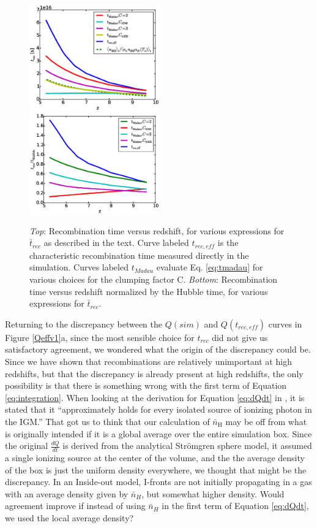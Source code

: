 \begin{figure}
    \includegraphics[width=0.5\textwidth]{tmisc.eps}
    \includegraphics[width=0.5\textwidth]{treceffhubble.eps}
    \caption{{\em Top}: Recombination time versus redshift, for various expressions for $\bar{t}_{rec}$ as described in the text. Curve labeled $t_{rec,eff}$ is the characteristic recombination time measured directly in the simulation. Curves labeled $t_{Madau}$ evaluate Eq. \eqref{eq:tmadau} for various choices for the clumping factor C. {\em Bottom}: Recombination time versus redshift normalized by the Hubble time, for various expressions for $\bar{t}_{rec}$.}
    \label{treceffhubble}
\end{figure}

Returning to the discrepancy between the $Q(sim)$ and $Q(t_{rec,eff})$ curves in Figure \ref{Qeffv1}a, since the most sensible choice for $t_{rec}$ did not give us satisfactory agreement, we wondered what the origin of the discrepancy could be.  Since we have shown that recombinations are relatively unimportant at high redshifts, but that the discrepancy is already present at high redshifts, the only possibility is that there is something wrong with the first term of Equation \eqref{eq:integration}. When looking at the derivation for Equation \eqref{eq:dQdt} in \cite{MadauEtAl1999}, it is stated that it ``approximately holds for every isolated source of ionizing photon in the IGM.''  That got us to think that our calculation of $\bar{n}_\mathrm{H}$ may be off from what is originally intended if it is a global average over the entire simulation box.  Since the original $\frac{dQ}{dt}$ is derived from the analytical Str\"{o}mgren sphere model, it assumed a single ionizing source at the center of the volume, and the the average density of the box is just the uniform density everywhere, we thought that might be the discrepancy.  In an Inside-out model, I-fronts are not initially propagating in a gas with an average density given by $\bar{n}_H$, but somewhat higher density. Would agreement improve if instead of using $\bar{n}_H$ in the first term of Equation \eqref{eq:dQdt}, we used the local average density?

